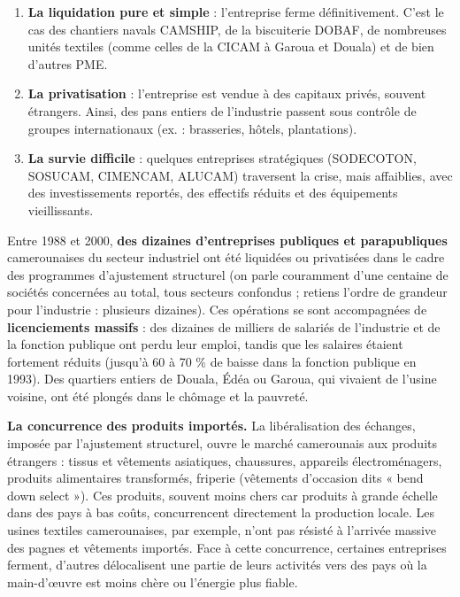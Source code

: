 \documentclass[11pt]{article}
\newcommand{\cle}[1]{{\popxbold\color{popdark}#1}}
\begin{document}
\begin{enumerate}
\item \textbf{La liquidation pure et simple} : l'entreprise ferme définitivement. C'est le cas des chantiers navals \cle{CAMSHIP}, de la biscuiterie \cle{DOBAF}, de nombreuses unités textiles (comme celles de la CICAM à Garoua et Douala) et de bien d'autres PME.
\item \textbf{La privatisation} : l'entreprise est vendue à des capitaux privés, souvent étrangers. Ainsi, des pans entiers de l'industrie passent sous contrôle de groupes internationaux (ex. : brasseries, hôtels, plantations).
\item \textbf{La survie difficile} : quelques entreprises stratégiques (\cle{SODECOTON}, \cle{SOSUCAM}, \cle{CIMENCAM}, \cle{ALUCAM}) traversent la crise, mais affaiblies, avec des investissements reportés, des effectifs réduits et des équipements vieillissants.
\end{enumerate}

\begin{exemplebox}
Entre 1988 et 2000, \textbf{des dizaines d'entreprises publiques et parapubliques} camerounaises du secteur industriel ont été liquidées ou privatisées dans le cadre des programmes d'ajustement structurel (on parle couramment d'une centaine de sociétés concernées au total, tous secteurs confondus ; retiens l'ordre de grandeur pour l'industrie : plusieurs dizaines). Ces opérations se sont accompagnées de \textbf{licenciements massifs} : des dizaines de milliers de salariés de l'industrie et de la fonction publique ont perdu leur emploi, tandis que les salaires étaient fortement réduits (jusqu'à 60 à 70 \% de baisse dans la fonction publique en 1993). Des quartiers entiers de Douala, Édéa ou Garoua, qui vivaient de l'usine voisine, ont été plongés dans le chômage et la pauvreté.
\end{exemplebox}

\textbf{La concurrence des produits importés.} La libéralisation des échanges, imposée par l'ajustement structurel, ouvre le marché camerounais aux produits étrangers : tissus et vêtements asiatiques, chaussures, appareils électroménagers, produits alimentaires transformés, friperie (vêtements d'occasion dits « \cle{bend down select} »). Ces produits, souvent moins chers car produits à grande échelle dans des pays à bas coûts, concurrencent directement la production locale. Les usines textiles camerounaises, par exemple, n'ont pas résisté à l'arrivée massive des pagnes et vêtements importés. Face à cette concurrence, certaines entreprises ferment, d'autres \cle{délocalisent} une partie de leurs activités vers des pays où la main-d'œuvre est moins chère ou l'énergie plus fiable.
\end{document}
